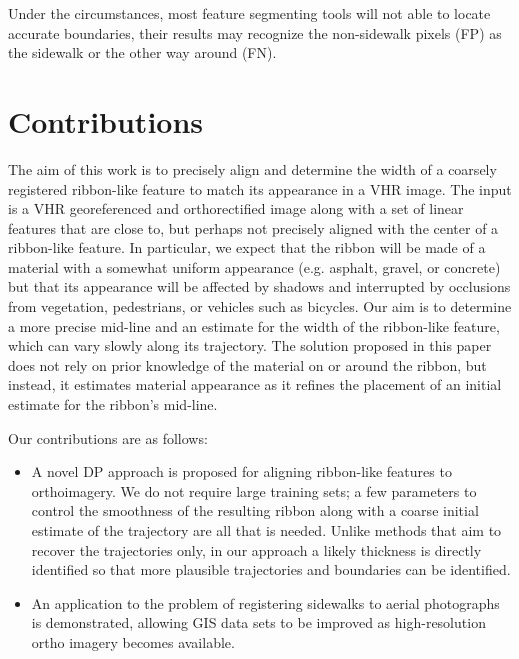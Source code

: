 Under the circumstances, most feature segmenting tools will not able to locate accurate boundaries, their results may recognize the non-sidewalk pixels (FP) as the sidewalk or the other way around (FN). 

\section{Contributions}

The aim of this work is to precisely align and determine the width of a coarsely registered ribbon-like feature to match its appearance in a \ac{VHR} image.
The input is a \ac{VHR} georeferenced and orthorectified image along with a set of linear features that are close to, but perhaps not precisely aligned with the center of a ribbon-like feature. 
In particular, we expect that the ribbon will be made of a material with a somewhat uniform appearance (e.g. asphalt, gravel, or concrete) but that its appearance will be affected by shadows and interrupted by occlusions from vegetation, pedestrians, or vehicles such as bicycles. 
Our aim is to determine a more precise mid-line and an estimate for the width of the ribbon-like feature, which can vary slowly along its trajectory. 
The solution proposed in this paper does not rely on prior knowledge of the material on or around the ribbon, but instead, it estimates material appearance as it refines the placement of an initial estimate for the ribbon's mid-line.
	
	Our contributions are as follows:
	\begin{itemize}
		\item A novel \ac{DP} approach is proposed for aligning ribbon-like features to orthoimagery.
		\subitem We do not require large training sets; a few parameters to control the smoothness of the resulting ribbon along with a coarse initial estimate of the trajectory are all that is needed.
		\subitem Unlike methods that aim to recover the trajectories only, in our approach a likely thickness is directly identified so that more plausible trajectories and boundaries can be identified.
		\item An application to the problem of registering sidewalks to aerial photographs is demonstrated, allowing \ac{GIS} data sets to be improved as high-resolution ortho imagery becomes available. 
	\end{itemize}